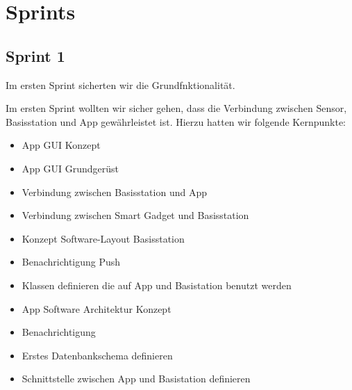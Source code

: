 \section{Sprints}


\subsection{Sprint 1}
Im ersten Sprint sicherten wir die Grundfnktionalität. 

Im ersten Sprint wollten wir sicher gehen, dass die Verbindung zwischen Sensor, Basisstation und App gewährleistet ist. Hierzu hatten wir folgende Kernpunkte:
\begin{itemize}
	\item App GUI Konzept 
	\item App GUI Grundgerüst
	\item Verbindung zwischen Basisstation und App
	\item Verbindung zwischen Smart Gadget und Basisstation
	\item Konzept Software-Layout Basisstation
	\item Benachrichtigung Push
	\item Klassen definieren die auf App und Basistation benutzt werden
	\item App Software Architektur Konzept
	\item Benachrichtigung
	\item Erstes Datenbankschema definieren
	\item Schnittstelle zwischen App und Basistation definieren
\end{itemize}

